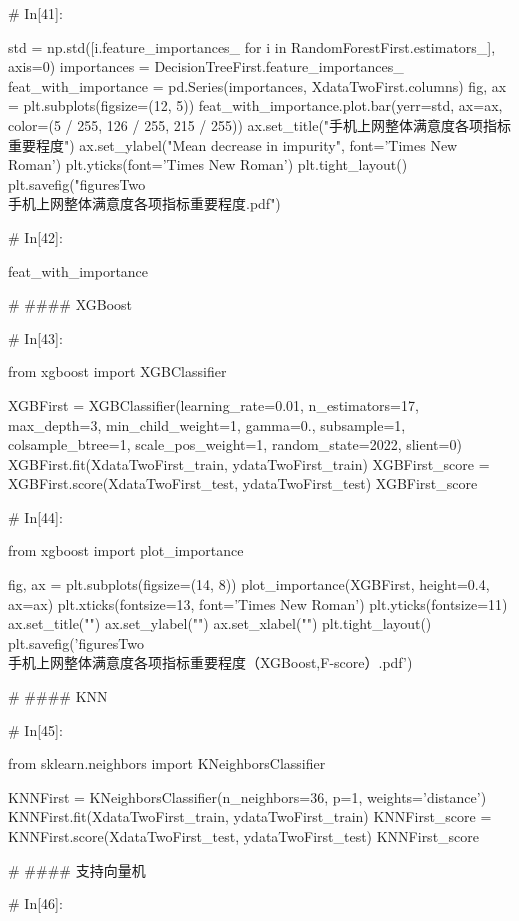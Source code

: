 \documentclass{MathorCupmodeling}
\begin{document}
\begin{python}
	# In[41]:
	
	
	std = np.std([i.feature_importances_ for i in RandomForestFirst.estimators_], axis=0)
	importances = DecisionTreeFirst.feature_importances_
	feat_with_importance = pd.Series(importances, XdataTwoFirst.columns)
	fig, ax = plt.subplots(figsize=(12, 5))
	feat_with_importance.plot.bar(yerr=std, ax=ax, color=(5 / 255, 126 / 255, 215 / 255))
	ax.set_title("手机上网整体满意度各项指标重要程度")
	ax.set_ylabel("Mean decrease in impurity", font='Times New Roman')
	plt.yticks(font='Times New Roman')
	plt.tight_layout()
	plt.savefig("figuresTwo\\[附件2]手机上网整体满意度各项指标重要程度.pdf")
	
	# In[42]:
	
	
	feat_with_importance
	
	# #### XGBoost
	
	# In[43]:
	
	
	from xgboost import XGBClassifier
	
	XGBFirst = XGBClassifier(learning_rate=0.01,
							 n_estimators=17,
							 max_depth=3,
							 min_child_weight=1,
							 gamma=0.,
							 subsample=1,
							 colsample_btree=1,
							 scale_pos_weight=1,
							 random_state=2022,
							 slient=0)
	XGBFirst.fit(XdataTwoFirst_train, ydataTwoFirst_train)
	XGBFirst_score = XGBFirst.score(XdataTwoFirst_test, ydataTwoFirst_test)
	XGBFirst_score
	
	# In[44]:
	
	
	from xgboost import plot_importance
	
	fig, ax = plt.subplots(figsize=(14, 8))
	plot_importance(XGBFirst, height=0.4, ax=ax)
	plt.xticks(fontsize=13, font='Times New Roman')
	plt.yticks(fontsize=11)
	ax.set_title("")
	ax.set_ylabel("")
	ax.set_xlabel("")
	plt.tight_layout()
	plt.savefig('figuresTwo\\[附件2]手机上网整体满意度各项指标重要程度（XGBoost,F-score）.pdf')
	
	# #### KNN
	
	# In[45]:
	
	
	from sklearn.neighbors import KNeighborsClassifier
	
	KNNFirst = KNeighborsClassifier(n_neighbors=36, p=1, weights='distance')
	KNNFirst.fit(XdataTwoFirst_train, ydataTwoFirst_train)
	KNNFirst_score = KNNFirst.score(XdataTwoFirst_test, ydataTwoFirst_test)
	KNNFirst_score
	
	# #### 支持向量机
	
	# In[46]:
	

\end{python}
\end{document}
